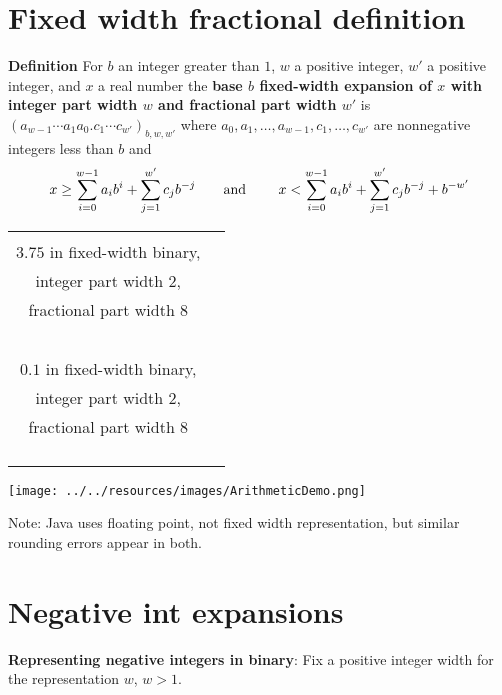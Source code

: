 \documentclass[12pt, oneside]{article}
\begin{document}
\section*{Fixed width fractional definition}


{\bf Definition} For $b$ an integer greater than $1$, $w$ a positive integer, 
$w'$ a positive  integer, and $x$ a real number the {\bf base $b$ fixed-width 
expansion of $x$ with integer part width $w$  and fractional part width $w'$} is
$(a_{w-1} \cdots a_1 a_0 .  c_{1} \cdots c_{w'})_{b,w,w'}$
where  $a_0, a_1, \ldots, a_{w-1}, c_1, \ldots, c_{w'}$ are nonnegative integers less than $b$ and
$$x \geq \sum_{i=0}^{w-1} a_{i} b^{i} + \sum_{j=1}^{w'}  c_{j} b^{-j} \hfill
\textrm{\qquad and \qquad}
\hfill x < \sum_{i=0}^{w-1} a_{i} b^{i} + \sum_{j=1}^{w'} c_{j} b^{-j} + b^{-w'}$$

\begin{center}
\begin{tabular}{|c|p{5in}|}
\hline
& \\
$3.75$  in fixed-width binary,& \\
integer part width $2$,&\\
 fractional part width $8$ & \\
& \\
& \\
& \\
& \\
\hline
& \\
$0.1$  in fixed-width binary, & \\
integer part width $2$, &\\
 fractional part width $8$ & \\
 & \\
 & \\
 & \\
 & \\
 \hline
\end{tabular}
\end{center}

\vfill

\texttt{[image: ../../resources/images/ArithmeticDemo.png]}

Note: Java uses floating point, not fixed width representation, but similar rounding errors appear in both.
 \vfill
\section*{Negative int expansions}


{\bf Representing negative integers in binary}: Fix a positive integer  width for the representation  $w$, $w >1$.
\end{document}
